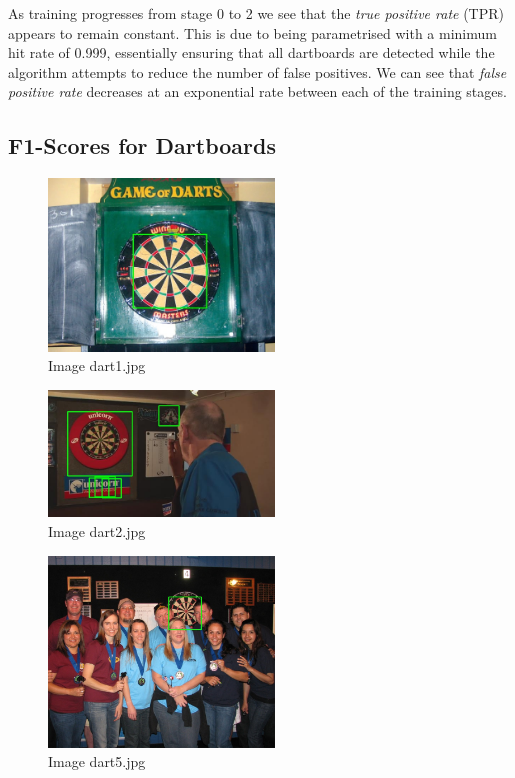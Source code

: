 \documentclass[conference]{IEEEtran}
\begin{document}
As training progresses from stage 0 to 2 we see that the \textit{true positive rate} (TPR) appears to remain constant. This is due to being parametrised with a minimum hit rate of 0.999, essentially ensuring that all dartboards are detected while the algorithm attempts to reduce the number of false positives. We can see that \textit{false positive rate} decreases at an exponential rate between each of the training stages.

\subsection{F1-Scores for Dartboards}

\begin{figure}[ht!]
	\centering
	\includegraphics[width=60mm]{img/Viola_Jones_Darts/detected_dart1.jpg}
	\caption{Image dart1.jpg \label{img_dart_1}}
\end{figure}

\begin{figure}[ht!]
	\centering
	\includegraphics[width=60mm]{img/Viola_Jones_Darts/detected_dart2.jpg}
	\caption{Image dart2.jpg \label{img_dart_2}}
\end{figure}

\begin{figure}[ht!]
	\centering
	\includegraphics[width=60mm]{img/Viola_Jones_Darts/detected_dart5.jpg}
	\caption{Image dart5.jpg \label{img_dart_5}}
\end{figure}
\end{document}
